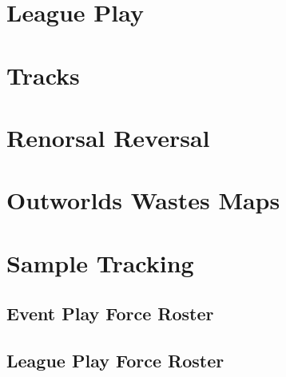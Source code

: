 \documentclass{article}
\newcommand{\mysectiontitle}{}
\newcommand{\newsection}[2]{\renewcommand{\mysectiontitle}{#2}\section{#1}}
\begin{document}


\newpage

\newsection{League Play}{league-play}
\label{sec:league_play}



\newpage

\newsection{Tracks}{scenarios}
\label{sec:scenarios}



\newpage

\newsection{Renorsal Reversal}{short-story}



\newpage

\newsection{Outworlds Wastes Maps}{outworlds-wastes-map}
\label{sec:outworlds_wastes_map}





\newpage

\newsection{Sample Tracking}{sample-tracking}
\label{sec:sample_tracking}

\subsection{Event Play Force Roster}



\subsection{League Play Force Roster}
\end{document}
